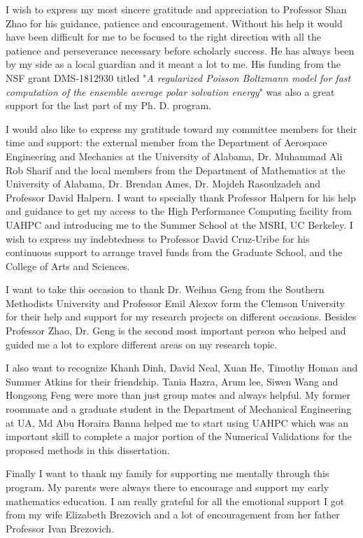 I wish to express my most sincere gratitude and appreciation to Professor Shan Zhao for his guidance, patience and encouragement. Without his help it would have been difficult for me to be focused to the right direction with all the patience and perseverance necessary before scholarly success. He has always been by my side as a local guardian and it meant a lot to me.  His funding from the NSF grant DMS-1812930 titled "{\it A regularized Poisson Boltzmann model for fast computation of the ensemble average polar solvation energy}" was also a great support for the last part of my Ph. D. program. 

I would also like to express my gratitude toward my committee members for their time and support: the external member from the Department of Aerospace Engineering and Mechanics at the University of Alabama, Dr. Muhammad Ali Rob Sharif and the local members from the Department of Mathematics at the University of Alabama, Dr. Brendan Ames, Dr. Mojdeh Rasoulzadeh and Professor David Halpern. I want to specially thank Professor Halpern for his help and guidance to get my access to the High Performance Computing facility from UAHPC and introducing me to the Summer School at the MSRI, UC Berkeley. I wish to express my indebtedness to Professor David Cruz-Uribe for his continuous support to arrange travel funds from the Graduate School, and the College of Arts and Sciences. 

I want to take this occasion to thank Dr. Weihua Geng from the Southern Methodists University and Professor Emil Alexov form the Clemson University for their help and support for my research projects on different occasions. Besides Professor Zhao, Dr. Geng is the second most important person who helped and guided me a lot to explore different areas on my research topic. 

I also want to recognize Khanh Dinh, David Neal, Xuan He, Timothy Homan and Summer Atkins for their friendship. Tania Hazra, Arum lee, Siwen Wang and Hongsong Feng were more than just group mates and always helpful. My former  roommate and a graduate student in the Department of Mechanical Engineering at UA, Md Abu Horaira Banna helped me to start using UAHPC which was an important skill to complete a major portion of the Numerical Validations for the proposed methods in this dissertation. 

Finally I want to thank my family for supporting me mentally through this program. My parents were always there to encourage and support my early mathematics education. I am really grateful for all the emotional support I got from my wife Elizabeth Brezovich and a lot of encouragement from her father Professor Ivan Brezovich.


